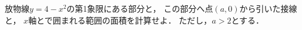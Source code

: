 \documentclass[../../main.tex]{subfiles}
\begin{document}
放物線$y=4-x^2$の第1象限にある部分と，
この部分へ点$(a,0)$から引いた接線と，
$x$軸とで囲まれる範囲の面積を計算せよ．
ただし，$a>2$とする．
\end{document}
